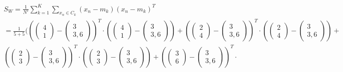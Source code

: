 \documentclass[a4paper,parskip=full-]{article}
\begin{document}
\begin{multline*}
S_W =  \frac{1}{N'} \sum^K_{k=1} \sum_{x_n \in C_k} (x_n-m_k)(x_n-m_k)^T \\
=  \frac{1}{5+5} \Biggl(
\left( \begin{pmatrix} 4 \\ 1 \end{pmatrix} - \begin{pmatrix} 3 \\ 3,6 \end{pmatrix} \right)^T \cdot
\left( \begin{pmatrix} 4 \\ 1 \end{pmatrix} - \begin{pmatrix} 3 \\ 3,6 \end{pmatrix} \right) + 
\left( \begin{pmatrix} 2 \\ 4 \end{pmatrix} - \begin{pmatrix} 3 \\ 3,6 \end{pmatrix} \right)^T \cdot
\left( \begin{pmatrix} 2 \\ 4 \end{pmatrix} - \begin{pmatrix} 3 \\ 3,6 \end{pmatrix} \right) + \\
\left( \begin{pmatrix} 2 \\ 3 \end{pmatrix} - \begin{pmatrix} 3 \\ 3,6 \end{pmatrix} \right)^T \cdot
\left( \begin{pmatrix} 2 \\ 3 \end{pmatrix} - \begin{pmatrix} 3 \\ 3,6 \end{pmatrix} \right) + 
\left( \begin{pmatrix} 3 \\ 6 \end{pmatrix} - \begin{pmatrix} 3 \\ 3,6 \end{pmatrix} \right)^T \cdot

\end{multline*}
\end{document}
